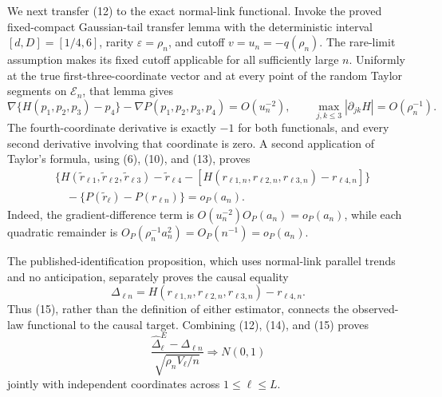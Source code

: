 We next transfer (12) to the exact normal-link functional. Invoke the proved fixed-compact Gaussian-tail transfer lemma with the deterministic interval \([d,D]=[1/4,6]\), rarity \(\varepsilon=\rho_n\), and cutoff \(v=u_n=-q(\rho_n)\). The rare-limit assumption makes its fixed cutoff applicable for all sufficiently large \(n\). Uniformly at the true first-three-coordinate vector and at every point of the random Taylor segments on \(\mathcal E_n\), that lemma gives
\[
 \nabla\{H(p_1,p_2,p_3)-p_4\}-\nabla P(p_1,p_2,p_3,p_4)
 =O(u_n^{-2}),
 \qquad
 \max_{j,k\leq3}|\partial_{jk}H|=O(\rho_n^{-1}).
\tag{13}
\]
The fourth-coordinate derivative is exactly \(-1\) for both functionals, and every second derivative involving that coordinate is zero. A second application of Taylor's formula, using (6), (10), and (13), proves
\[
 \begin{aligned}
 &\{H(\widetilde r_{\ell1},\widetilde r_{\ell2},\widetilde r_{\ell3})
 -\widetilde r_{\ell4}-[H(r_{\ell1,n},r_{\ell2,n},r_{\ell3,n})-r_{\ell4,n}]\}\\
 &\quad-\{P(\widetilde r_\ell)-P(r_{\ell n})\}=o_P(a_n).
 \end{aligned}
\tag{14}
\]
Indeed, the gradient-difference term is \(O(u_n^{-2})O_P(a_n)=o_P(a_n)\), while each quadratic remainder is \(O_P(\rho_n^{-1}a_n^2)=O_P(n^{-1})=o_P(a_n)\).

The published-identification proposition, which uses normal-link parallel trends and no anticipation, separately proves the causal equality
\[
 \Delta_{\ell n}=H(r_{\ell1,n},r_{\ell2,n},r_{\ell3,n})-r_{\ell4,n}.
\tag{15}
\]
Thus (15), rather than the definition of either estimator, connects the observed-law functional to the causal target. Combining (12), (14), and (15) proves
\[
 \frac{\widehat\Delta^E_\ell-\Delta_{\ell n}}
 {\sqrt{\rho_nV_\ell/n}}\Rightarrow N(0,1)
\tag{16}
\]
jointly with independent coordinates across \(1\leq\ell\leq L\).

